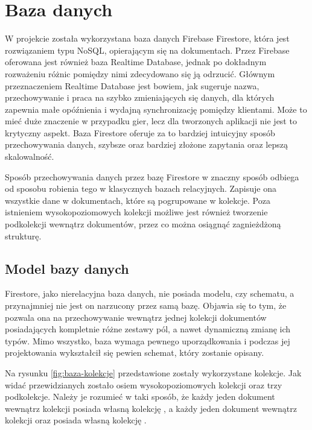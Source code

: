 \chapter{Baza danych}

W projekcie została wykorzystana baza danych Firebase Firestore, która jest rozwiązaniem typu NoSQL, opierającym się na dokumentach. Przez Firebase oferowana jest również baza Realtime Database, jednak po dokładnym rozważeniu różnic pomiędzy nimi zdecydowano się ją odrzucić. Głównym przeznaczeniem Realtime Database jest bowiem, jak sugeruje nazwa, przechowywanie i praca na szybko zmieniających się danych, dla których zapewnia małe opóźnienia i wydajną synchronizację pomiędzy klientami. Może to mieć duże znaczenie w przypadku gier, lecz dla tworzonych aplikacji nie jest to krytyczny aspekt. Baza Firestore oferuje za to bardziej intuicyjny sposób przechowywania danych, szybsze oraz bardziej złożone zapytania oraz lepszą skalowalność.

Sposób przechowywania danych przez bazę Firestore w znaczny sposób odbiega od sposobu robienia tego w klasycznych bazach relacyjnych. Zapisuje ona wszystkie dane w dokumentach, które są pogrupowane w kolekcje. Poza istnieniem wysokopoziomowych kolekcji możliwe jest również tworzenie podkolekcji wewnątrz dokumentów, przez co można osiągnąć zagnieżdżoną strukturę.


\section{Model bazy danych}

Firestore, jako nierelacyjna baza danych, nie posiada modelu, czy schematu, a przynajmniej nie jest on narzucony przez samą bazę. Objawia się to tym, że pozwala ona na przechowywanie wewnątrz jednej kolekcji dokumentów posiadających kompletnie różne zestawy pól, a nawet dynamiczną zmianę ich typów. Mimo wszystko, baza wymaga pewnego uporządkowania i podczas jej projektowania wykształcił się pewien schemat, który zostanie opisany.

Na rysunku \ref{fig:baza-kolekcje} przedstawione zostały wykorzystane kolekcje. Jak widać przewidzianych zostało osiem wysokopoziomowych kolekcji oraz trzy podkolekcje. Należy je rozumieć w taki sposób, że każdy jeden dokument wewnątrz kolekcji  posiada własną kolekcję , a każdy jeden dokument wewnątrz kolekcji  oraz  posiada własną kolekcję . 


